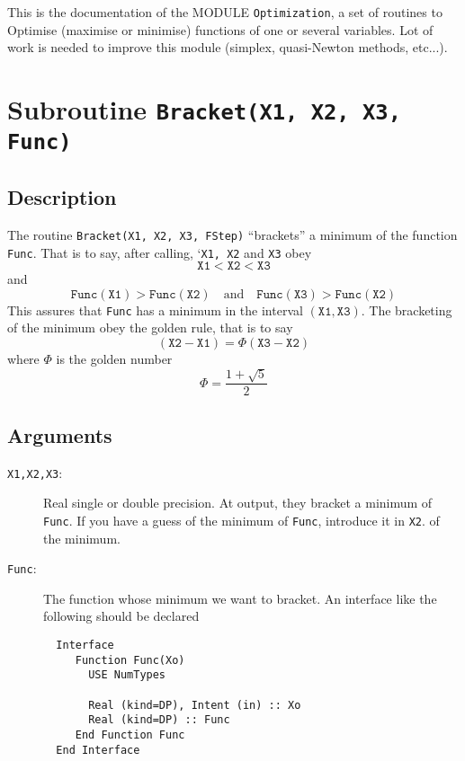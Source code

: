 
This is the documentation of the MODULE \texttt{Optimization}, a set
of routines to Optimise (maximise or minimise) functions of one or
several variables. Lot of work is needed to improve this module
(simplex, quasi-Newton methods, etc...).

\section{Subroutine \texttt{Bracket(X1, X2, X3, Func) }}

\subsection{Description}

The routine \texttt{Bracket(X1, X2, X3, FStep)} ``brackets'' a minimum
of the function  \texttt{Func}. That is to say, after calling,
`\texttt{X1, X2} and \texttt{X3} obey
\begin{equation}
  \mathtt{X1 < X2 < X3}
\end{equation}
and
\begin{equation}
  \mathtt{Func}(\mathtt{X1}) > \mathtt{Func}(\mathtt{X2})\quad \text{and}\quad \mathtt{Func}(\mathtt{X3})
  > \mathtt{Func}(\mathtt{X2}) 
\end{equation}
This assures that \texttt{Func} has a minimum in the interval
$(\mathtt{X1,X3})$. The bracketing of the minimum obey the golden
rule, that is to say
\begin{equation}
  (\mathtt{X2-X1}) = \Phi (\mathtt{X3-X2})
\end{equation}
where $\Phi$ is the golden number
\begin{equation}
  \Phi = \frac{1+\sqrt{5}}{2}
\end{equation}

\subsection{Arguments}

\begin{description}
\item[\texttt{X1,X2,X3}:] Real single or double precision. At output,
  they bracket a minimum of \texttt{Func}. If you have a guess of the
  minimum of \texttt{Func}, introduce it in \texttt{X2}.
  of the minimum.
\item[\texttt{Func}:]  The function whose minimum we want to
  bracket. An interface like the following should be 
  declared
\begin{verbatim}
  Interface
     Function Func(Xo)
       USE NumTypes
       
       Real (kind=DP), Intent (in) :: Xo
       Real (kind=DP) :: Func
     End Function Func
  End Interface
\end{verbatim}
\end{description}

